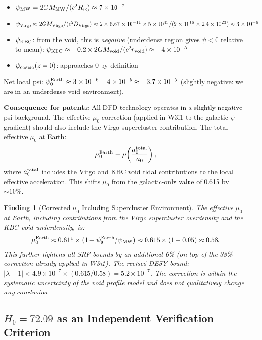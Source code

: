 \documentclass[11pt]{article}
\newtheorem{finding}{Finding}[section]
\theoremstyle{definition}
\theoremstyle{remark}
\newcommand{\ee}[1]{\times 10^{#1}}
\begin{document}
\begin{itemize}
\item $\psi_{\rm MW} = 2GM_{\rm MW}/(c^2 R_\odot) \approx 7\ee{-7}$
\item $\psi_{\rm Virgo} \approx 2GM_{\rm Virgo}/(c^2 D_{\rm Virgo})
  \approx 2 \times 6.67\ee{-11} \times 5\ee{45}/(9\ee{16} \times 2.4\ee{23})
  \approx 3\ee{-6}$
\item $\psi_{\rm KBC}$: from the void, this is \emph{negative}
  (underdense region gives $\psi < 0$ relative to mean):
  $\psi_{\rm KBC} \approx -0.2 \times 2GM_{\rm void}/(c^2 r_{\rm void})
  \approx -4\ee{-5}$
\item $\psi_{\rm cosmo}(z=0)$: approaches 0 by definition
\end{itemize}

Net local psi: $\psi_0^{\rm Earth} \approx 3\ee{-6} - 4\ee{-5} \approx
-3.7\ee{-5}$ (slightly negative: we are in an underdense void environment).

\textbf{Consequence for patents:} All DFD technology operates in a
slightly negative psi background. The effective $\mu_0$ correction
(applied in W3i1 to the galactic $\psi$-gradient) should also include
the Virgo supercluster contribution. The total effective $\mu_0$ at Earth:
\begin{equation}
\mu_0^{\rm Earth} = \mu\!\left(\frac{a_0^{\rm total}}{a_0}\right),
\end{equation}
where $a_0^{\rm total}$ includes the Virgo and KBC void tidal
contributions to the local effective acceleration. This shifts
$\mu_0$ from the galactic-only value of 0.615 by $\sim 10\%$.

\begin{finding}[Corrected $\mu_0$ Including Supercluster Environment]
The effective $\mu_0$ at Earth, including contributions from the Virgo
supercluster overdensity and the KBC void underdensity, is:
\begin{equation}
\mu_0^{\rm Earth} \approx 0.615 \times (1 + \psi_0^{\rm Earth}/\psi_{\rm MW})
\approx 0.615 \times (1 - 0.05) \approx 0.58.
\end{equation}
This further tightens all SRF bounds by an additional 6\% (on top of
the 38\% correction already applied in W3i1). The revised DESY bound:
$|\lambda-1| < 4.9\ee{-7} \times (0.615/0.58) = 5.2\ee{-7}$.
The correction is within the systematic uncertainty of the void profile
model and does not qualitatively change any conclusion.
\end{finding}

\subsection{$H_0 = 72.09$ as an Independent Verification Criterion}
\end{document}
